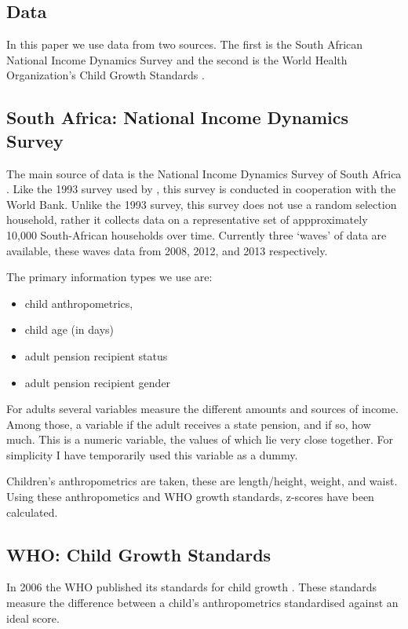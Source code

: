 \begin{refsection}
\section{Data}
\label{sa:data}
In this paper we use data from two sources.
The first is the South African National Income Dynamics Survey \parencite[NIDS][]{saldru2008nids, saldru2012nids, saldru2013nids} and the second is the World Health Organization's Child Growth Standards \parencite[WHO]{who2006child}.

\subsection{South Africa: National Income Dynamics Survey}
The main source of data is the National Income Dynamics Survey of South Africa \parencite{saldru2008nids, saldru2012nids, saldru2013nids}.
Like the 1993 survey used by \textcite{duflo2000child, duflo2003grandmothers}, this survey is conducted in cooperation with the World Bank.
Unlike the 1993 survey, this survey does not use a random selection household,
rather it collects data on a representative set of appproximately 10,000 South-African households over time.
Currently three `waves' of data are available, these waves data from 2008, 2012, and 2013 respectively.

The primary information types we use are:
\begin{itemize}
  \item child anthropometrics,
  \item child age (in days)
  \item adult pension recipient status
  \item adult pension recipient gender
\end{itemize}

For adults several variables measure the different amounts and sources of income.
Among those, a variable if the adult receives a state pension, and if so, how much.
This is a numeric variable, the values of which lie very close together.
For simplicity I have temporarily used this variable as a dummy.

Children's anthropometrics are taken, these are length/height, weight, and waist.
Using these anthropometics and WHO growth standards, z-scores have been calculated.



\subsection{WHO: Child Growth Standards}
In 2006 the WHO published its standards for child growth \parencite{who2006child}.
These standards measure the difference between a child's anthropometrics
standardised against an ideal score.


\end{refsection}
